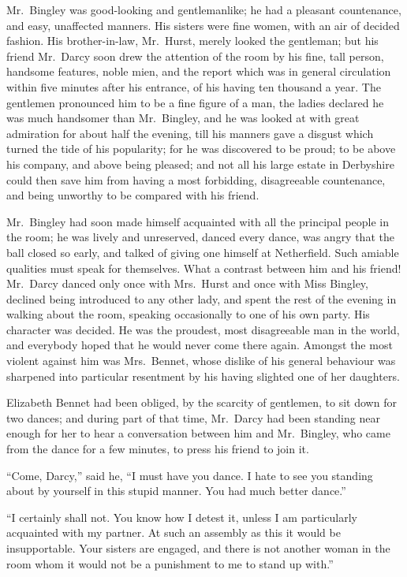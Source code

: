 \documentclass[12pt,english]{book}
\begin{document}
Mr.\ Bingley was good-looking and gentlemanlike; he had a pleasant
countenance, and easy, unaffected manners. His sisters were fine women,
with an air of decided fashion. His brother-in-law, Mr.\ Hurst, merely
looked the gentleman; but his friend Mr.\ Darcy soon drew the attention
of the room by his fine, tall person, handsome features, noble mien,
and the report which was in general circulation within five minutes
after his entrance, of his having ten thousand a year. The gentlemen
pronounced him to be a fine figure of a man, the ladies declared he
was much handsomer than Mr.\ Bingley, and he was looked at with great
admiration for about half the evening, till his manners gave a disgust
which turned the tide of his popularity; for he was discovered to
be proud; to be above his company, and above being pleased; and not
all his large estate in Derbyshire could then save him from having
a most forbidding, disagreeable countenance, and being unworthy to
be compared with his friend.

Mr.\ Bingley had soon made himself acquainted with all the principal
people in the room; he was lively and unreserved, danced every dance,
was angry that the ball closed so early, and talked of giving one
himself at Netherfield. Such amiable qualities must speak for themselves.
What a contrast between him and his friend! Mr.\ Darcy danced only
once with Mrs.\ Hurst and once with Miss Bingley, declined being
introduced to any other lady, and spent the rest of the evening in
walking about the room, speaking occasionally to one of his own party.
His character was decided. He was the proudest, most disagreeable
man in the world, and everybody hoped that he would never come there
again. Amongst the most violent against him was Mrs.\ Bennet, whose
dislike of his general behaviour was sharpened into particular resentment
by his having slighted one of her daughters.

Elizabeth Bennet had been obliged, by the scarcity of gentlemen, to
sit down for two dances; and during part of that time, Mr.\ Darcy
had been standing near enough for her to hear a conversation between
him and Mr.\ Bingley, who came from the dance for a few minutes,
to press his friend to join it.

{}``Come, Darcy,'' said he, {}``I must have you dance. I hate to
see you standing about by yourself in this stupid manner. You had
much better dance.''

{}``I certainly shall not. You know how I detest it, unless I am
particularly acquainted with my partner. At such an assembly as this
it would be insupportable. Your sisters are engaged, and there is
not another woman in the room whom it would not be a punishment to
me to stand up with.''
\end{document}
